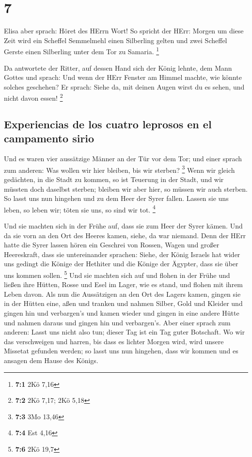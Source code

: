 \hypertarget{section-6}{%
\section{7}\label{section-6}}

 Elisa aber sprach: Höret des HErrn Wort! So spricht der
HErr: Morgen um diese Zeit wird ein Scheffel Semmelmehl einen Silberling
gelten und zwei Scheffel Gerste einen Silberling unter dem Tor zu
Samaria. \footnote{\textbf{7:1} 2Kö 7,16}

 Da antwortete der Ritter, auf dessen Hand sich der König
lehnte, dem Mann Gottes und sprach: Und wenn der HErr Fenster am Himmel
machte, wie könnte solches geschehen? Er sprach: Siehe da, mit deinen
Augen wirst du es sehen, und nicht davon essen! \footnote{\textbf{7:2}
  2Kö 7,17; 2Kö 5,18}

\hypertarget{experiencias-de-los-cuatro-leprosos-en-el-campamento-sirio}{%
\subsection{Experiencias de los cuatro leprosos en el campamento
sirio}\label{experiencias-de-los-cuatro-leprosos-en-el-campamento-sirio}}

 Und es waren vier aussätzige Männer an der Tür vor dem
Tor; und einer sprach zum anderen: Was wollen wir hier bleiben, bis wir
sterben? \footnote{\textbf{7:3} 3Mo 13,46}  Wenn wir
gleich gedächten, in die Stadt zu kommen, so ist Teuerung in der Stadt,
und wir müssten doch daselbst sterben; bleiben wir aber hier, so müssen
wir auch sterben. So lasst uns nun hingehen und zu dem Heer der Syrer
fallen. Lassen sie uns leben, so leben wir; töten sie uns, so sind wir
tot. \footnote{\textbf{7:4} Est 4,16}

 Und sie machten sich in der Frühe auf, dass sie zum Heer
der Syrer kämen. Und da sie vorn an den Ort des Heeres kamen, siehe, da
war niemand.  Denn der HErr hatte die Syrer lassen hören
ein Geschrei von Rossen, Wagen und großer Heereskraft, dass sie
untereinander sprachen: Siehe, der König Israels hat wider uns gedingt
die Könige der Hethiter und die Könige der Ägypter, dass sie über uns
kommen sollen. \footnote{\textbf{7:6} 2Kö 19,7}  Und sie
machten sich auf und flohen in der Frühe und ließen ihre Hütten, Rosse
und Esel im Lager, wie es stand, und flohen mit ihrem Leben davon.
 Als nun die Aussätzigen an den Ort des Lagers kamen,
gingen sie in der Hütten eine, aßen und tranken und nahmen Silber, Gold
und Kleider und gingen hin und verbargen's und kamen wieder und gingen
in eine andere Hütte und nahmen daraus und gingen hin und verbargen's.
 Aber einer sprach zum anderen: Lasst uns nicht also tun;
dieser Tag ist ein Tag guter Botschaft. Wo wir das verschweigen und
harren, bis dass es lichter Morgen wird, wird unsere Missetat gefunden
werden; so lasst uns nun hingehen, dass wir kommen und es ansagen dem
Hause des Königs.

